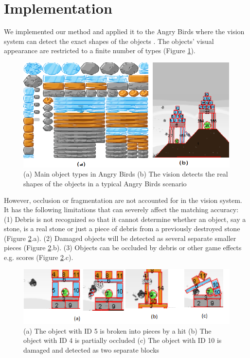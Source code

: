 \documentclass[letterpaper]{article}
\begin{document}
\section{Implementation}

We implemented our method and applied it to the Angry Birds where the vision system can detect the exact shapes of the objects \cite{andrewwang}. The objects' visual appearance are restricted to a finite number of types (Figure \ref{Templates}).  
\begin{figure}[t!]
\centering\includegraphics[scale=0.28]{Templates2.png}
\vspace{-2.5mm}
\caption{(a) Main object types in Angry Birds (b) The vision detects the real shapes of the objects in a typical Angry Birds scenario}
\label{Templates}
\vspace{-4mm}
\end{figure}
However, occlusion or fragmentation are not accounted for in the vision system.
It has the following limitations that can severely affect the matching accuracy: (1) Debris is not recognized so that it cannot determine whether an object, say a stone, is a real stone or just a piece of debris from a previously destroyed stone (Figure \ref{Fragments}.a). (2) Damaged objects will be detected as several separate smaller pieces (Figure \ref{Fragments}.b). (3) Objects can be occluded by debris or other game effects e.g. scores (Figure \ref{Fragments}.c).
\begin{figure}[t!]
\centering\includegraphics[scale=0.6]{Fragmentation2.png}
\vspace{-7mm}\caption{(a) The object with ID 5 is broken into pieces by a hit (b) The object with ID 4 is partially occluded (c) The object with ID 10 is damaged and detected as two separate blocks}
\label{Fragments}
\vspace{-5mm}
\end{figure}
\end{document}
